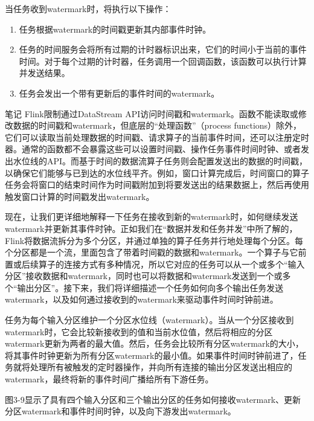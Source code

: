 \documentclass[oneside]{ctexbook}
\begin{document}
当任务收到watermark时，将执行以下操作：

\begin{enumerate}
  \item 任务根据watermark的时间戳更新其内部事件时钟。
  \item 任务的时间服务会将所有过期的计时器标识出来，它们的时间小于当前的事件时间。对于每个过期的计时器，任务调用一个回调函数，该函数可以执行计算并发送结果。
  \item 任务会发出一个带有更新后的事件时间的watermark。
\end{enumerate}

\begin{bclogo}[logo=\bcinfo, couleurBarre=orange, noborder=true, couleur=white]{笔记}
Flink限制通过DataStream API访问时间戳和watermark。函数不能读取或修改数据的时间戳和watermark，但底层的“处理函数”（process functions）除外，它们可以读取当前处理数据的时间戳、请求算子的当前事件时间，还可以注册定时器。通常的函数都不会暴露这些可以设置时间戳、操作任务事件时间时钟、或者发出水位线的API。而基于时间的数据流算子任务则会配置发送出的数据的时间戳，以确保它们能够与已到达的水位线平齐。例如，窗口计算完成后，时间窗口的算子任务会将窗口的结束时间作为时间戳附加到将要发送出的结果数据上，然后再使用触发窗口计算的时间戳发出watermark。
\end{bclogo}

现在，让我们更详细地解释一下任务在接收到新的watermark时，如何继续发送watermark并更新其事件时钟。正如我们在“数据并发和任务并发”中所了解的，Flink将数据流拆分为多个分区，并通过单独的算子任务并行地处理每个分区。每个分区都是一个流，里面包含了带着时间戳的数据和watermark。一个算子与它前置或后续算子的连接方式有多种情况，所以它对应的任务可以从一个或多个“输入分区”接收数据和watermark，同时也可以将数据和watermark发送到一个或多个“输出分区”。接下来，我们将详细描述一个任务如何向多个输出任务发送watermark，以及如何通过接收到的watermark来驱动事件时间时钟前进。

任务为每个输入分区维护一个分区水位线（watermark）。当从一个分区接收到watermark时，它会比较新接收到的值和当前水位值，然后将相应的分区watermark更新为两者的最大值。然后，任务会比较所有分区watermark的大小，将其事件时钟更新为所有分区watermark的最小值。如果事件时间时钟前进了，任务就将处理所有被触发的定时器操作，并向所有连接的输出分区发送出相应的watermark，最终将新的事件时间广播给所有下游任务。

图3-9显示了具有四个输入分区和三个输出分区的任务如何接收watermark、更新分区watermark和事件时间时钟，以及向下游发出watermark。
\end{document}

